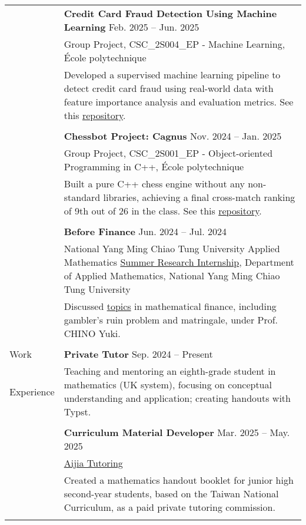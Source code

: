 \documentclass[letterpaper, 11pt]{article}
\begin{document}
\begin{center}
\begin{longtable}{p{0.76in}p{5.93in}}
        & \textbf{Credit Card Fraud Detection Using Machine Learning} \hfill Feb. 2025 -- Jun. 2025\\
        & Group Project, CSC\_2S004\_EP - Machine Learning, École polytechnique\\
        & Developed a supervised machine learning pipeline to detect credit card fraud using real-world data with feature importance analysis and evaluation metrics. See this \href{https://github.com/eiken59/ml_project/blob/main/README.md}{repository}.\\
        & \\

        & \textbf{Chessbot Project: Cagnus} \hfill Nov. 2024 -- Jan. 2025\\
        & Group Project, CSC\_2S001\_EP - Object-oriented Programming in C++, École polytechnique\\
        & Built a pure C++ chess engine without any non-standard libraries, achieving a final cross-match ranking of 9th out of 26 in the class. See this \href{https://github.com/jetzypetz/chess_bot/blob/main/docs/README.md}{repository}.\\
        & \\
        
        & \textbf{Before Finance} \hfill Jun. 2024 -- Jul. 2024\\
        & National Yang Ming Chiao Tung University Applied Mathematics \href{https://teshenglin.github.io/courses/2024_summer_research/}{Summer Research Internship}, Department of Applied Mathematics, National Yang Ming Chiao Tung University\\
        & Discussed \href{https://hackmd.io/@eiken-sc11/B1QcaW3B0}{topics} in mathematical finance, including gambler's ruin problem and matringale, under Prof. CHINO Yuki.\\
        & \\
        

        
        {\textcolor{OliveGreen}{Work}} & \textbf{Private Tutor} \hfill Sep. 2024 -- Present \\
        {\textcolor{OliveGreen}{Experience}} & Teaching and mentoring an eighth-grade student in mathematics (UK system), focusing on conceptual understanding and application; creating handouts with Typst.\\
        & \\
        
        & \textbf{Curriculum Material Developer} \hfill Mar. 2025 -- May. 2025 \\
        & \href{https://www.instagram.com/aijiatutoring/}{Aijia Tutoring}\\
        & Created a mathematics handout booklet for junior high second-year students, based on the Taiwan National Curriculum, as a paid private tutoring commission.\\
        & \\


\end{longtable}
\end{center}
\end{document}
